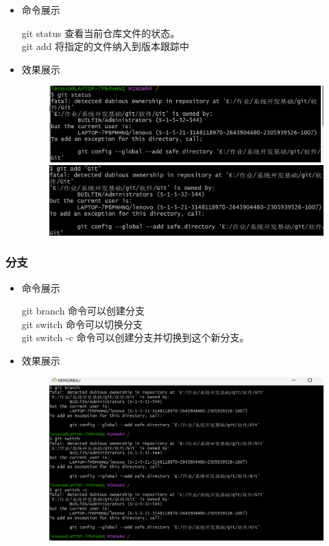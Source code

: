 \documentclass[UTF8]{ctexart}
\begin{document}
\begin{itemize}
  \item 命令展示
 
     git status 查看当前仓库文件的状态。\\
     git add     将指定的文件纳入到版本跟踪中
\item 效果展示
\begin{figure}[H]
\includegraphics[width=1\textwidth]{2}
\includegraphics[width=1\textwidth]{3}
\end{figure}
\end{itemize}

\subsubsection{分支}
\begin{itemize}
  \item 命令展示
 
     git branch 命令可以创建分支\\
     git switch 命令可以切换分支\\
     git switch -c 命令可以创建分支并切换到这个新分支。
\item 效果展示
 \begin{figure}[H]
\includegraphics[width=1\textwidth]{4}
\end{figure}
\end{itemize}
\end{document}
